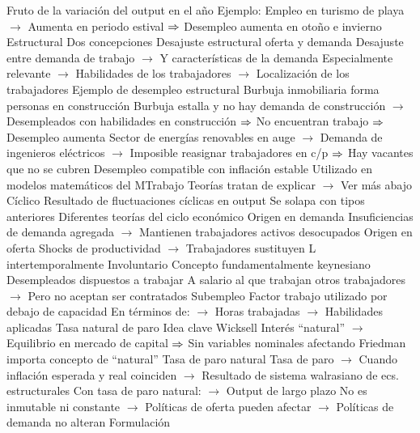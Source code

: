 \documentclass{nuevotema}
\begin{document}
\begin{esquemal}
				\4 Fruto de la variación del output en el año
				\4 Ejemplo:
				\4[] Empleo en turismo de playa
				\4[] $\to$ Aumenta en periodo estival
				\4[] $\Rightarrow$ Desempleo aumenta en otoño e invierno
			\3 Estructural
				\4[] Dos concepciones
				\4 Desajuste estructural oferta y demanda
				\4[] Desajuste entre demanda de trabajo
				\4[] $\to$ Y características de la demanda
				\4[] Especialmente relevante
				\4[] $\to$ Habilidades de los trabajadores
				\4[] $\to$ Localización de los trabajadores
				\4[$\to$] Ejemplo de desempleo estructural
				\4[] Burbuja inmobiliaria forma personas en construcción
				\4[] Burbuja estalla y no hay demanda de construcción
				\4[] $\to$ Desempleados con habilidades en construcción
				\4[] $\Rightarrow$ No encuentran trabajo
				\4[] $\Rightarrow$ Desempleo aumenta
				\4[] Sector de energías renovables en auge
				\4[] $\to$ Demanda de ingenieros eléctricos
				\4[] $\to$ Imposible reasignar trabajadores en c/p
				\4[] $\Rightarrow$ Hay vacantes que no se cubren
				\4 Desempleo compatible con inflación estable
				\4[] Utilizado en modelos matemáticos del MTrabajo
				\4[] Teorías tratan de explicar
				\4[] $\to$ Ver más abajo
			\3 Cíclico
				\4 Resultado de fluctuaciones cíclicas en output
				\4[] Se solapa con tipos anteriores
				\4 Diferentes teorías del ciclo económico
				\4 Origen en demanda
				\4[] Insuficiencias de demanda agregada
				\4[] $\to$ Mantienen trabajadores activos desocupados
				\4 Origen en oferta
				\4[] Shocks de productividad
				\4[] $\to$ Trabajadores sustituyen L intertemporalmente
			\3 Involuntario
				\4 Concepto fundamentalmente keynesiano
				\4 Desempleados dispuestos a trabajar
				\4[] A salario al que trabajan otros trabajadores
				\4[] $\to$ Pero no aceptan ser contratados
			\3 Subempleo
				\4 Factor trabajo utilizado por debajo de capacidad
				\4[] En términos de:
				\4[] $\to$ Horas trabajadas
				\4[] $\to$ Habilidades aplicadas
		\2 Tasa natural de paro
			\3 Idea clave
				\4 Wicksell
				\4[] Interés ``natural''
				\4[] $\to$ Equilibrio en mercado de capital
				\4[] $\Rightarrow$ Sin variables nominales afectando
				\4 Friedman importa concepto de ``natural''
				\4 Tasa de paro natural
				\4[] Tasa de paro
				\4[] $\to$ Cuando inflación esperada y real coinciden
				\4[] $\to$ Resultado de sistema walrasiano de ecs. estructurales
				\4[] Con tasa de paro natural:
				\4[] $\to$ Output de largo plazo
				\4[] No es inmutable ni constante
				\4[] $\to$ Políticas de oferta pueden afectar
				\4[] $\to$ Políticas de demanda no alteran
			\3 Formulación
				\4[] 

\end{esquemal}
\end{document}

